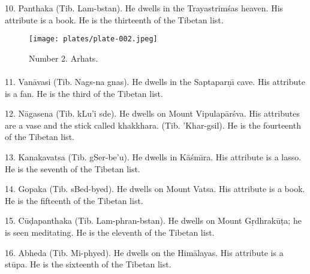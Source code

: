 \documentclass[a4paper, 12pt, oneside]{article}
\begin{document}
10. Panthaka (Tib. Lam-bstan). He dwells in the Trayastrim\'{s}as heaven. His attribute is a book. He is the thirteenth of the Tibetan list.

\clearpage
\begin{figure}[H]
\centering
\texttt{[image: plates/plate-002.jpeg]}
\caption*{Number 2. Arhats.}
\end{figure}
\clearpage
\paragraph{}
11. Van\={a}vasi (Tib. Nags-na gnas). He dwells in the Saptapar\d{n}\={\i} cave. His attribute is a fan. He is the third of the Tibetan list.

12. N\={a}gasena (Tib. kLu'i sde). He dwells on Mount Vipulap\={a}r\'{s}va. His attributes are a vase and the stick called khakkhara. (Tib. 'Khar-gsil). He is the fourteenth of the Tibetan list.

13. Kanakavatsa (Tib. gSer-be'u). He dwells in K\={a}\'{s}m\={\i}ra. His attribute is a lasso. He is the seventh of the Tibetan list.

14. Gopaka (Tib. sBed-byed). He dwells on Mount Vatsa. His attribute is a book. He is the fifteenth of the Tibetan list.

15. C\={u}\d{d}apanthaka (Tib. Lam-phran-bstan). He dwells on Mount G\d{r}dhrak\={u}\d{t}a; he is seen meditating. He is the eleventh of the Tibetan list.

16. Abheda (Tib. Mi-phyed). He dwells on the Him\={a}layas. His attribute is a st\={u}pa. He is the sixteenth of the Tibetan list.
\end{document}
